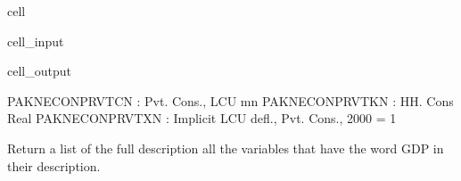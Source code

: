 \documentclass[letterpaper,10pt,english]{jupyterBook}
\begin{document}
\begin{sphinxuseclass}{cell}\begin{sphinxVerbatimInput}

\begin{sphinxuseclass}{cell_input}
\begin{sphinxVerbatim}[commandchars=\\\{\}]
\PYG{p}{[}\PYG{p}{]}
\end{sphinxVerbatim}

\end{sphinxuseclass}\end{sphinxVerbatimInput}
\begin{sphinxVerbatimOutput}

\begin{sphinxuseclass}{cell_output}
\begin{sphinxVerbatim}[commandchars=\\\{\}]
PAKNECONPRVTCN : Pvt. Cons., LCU mn
PAKNECONPRVTKN : HH. Cons Real
PAKNECONPRVTXN : Implicit LCU defl., Pvt. Cons., 2000 = 1
\end{sphinxVerbatim}

\end{sphinxuseclass}\end{sphinxVerbatimOutput}

\end{sphinxuseclass}
\sphinxAtStartPar
Return a list of the full description  all the variables that have the word GDP in their description.
\end{document}
